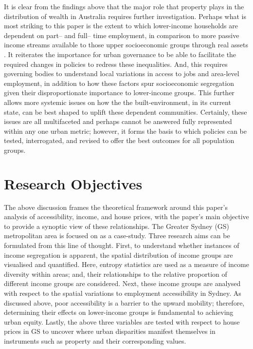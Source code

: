 It is clear from the findings above that the major role that property plays in the distribution of wealth in Australia requires further investigation. Perhaps what is most striking to this paper is the extent to which lower-income households are dependent on part-- and full-- time employment, in comparison to more passive income streams available to those upper socioeconomic groups through real assets \citep{davidson2018inequality}. It reiterates the importance for urban governance to be able to facilitate the required changes in policies to redress these inequalities. And, this requires governing bodies to understand local variations in access to jobs and area-level employment, in addition to how these factors spur socioeconomic segregation given their disproportionate importance to lower-income groups. This further allows more systemic issues on how the the built-environment, in its current state, can be best shaped to uplift these dependent communities. Certainly, these issues are all multifaceted and perhaps cannot be answered fully represented within any one urban metric; however, it forms the basis to which policies can be tested, interrogated, and revised to offer the best outcomes for all population groups.\\

\section{Research Objectives}

The above discussion frames the theoretical framework around this paper's analysis of accessibility, income, and house prices, with the paper's main objective to provide a synoptic view of these relationships. The Greater Sydney (GS) metropolitan area is focused on as a case-study. Three research aims can be formulated from this line of thought. First, to understand whether instances of income segregation is apparent, the spatial distribution of income groups are visualised and quantified. Here, entropy statistics are used as a measure of income diversity within areas; and, their relationships to the relative proportion of different income groups are considered. Next, these income groups are analysed with respect to the spatial variations to employment accessibility in Sydney. As discussed above, poor accessibility is a barrier to the upward mobility; therefore, determining their effects on lower-income groups is fundamental to achieving urban equity. Lastly, the above three variables are tested with respect to house prices in GS to uncover where urban disparities manifest themselves in instruments such as property and their corresponding values.\\

